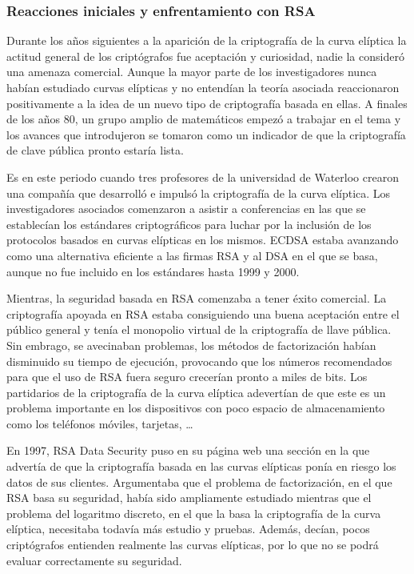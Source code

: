 \documentclass[
  a4paper,
  12pt,
  spanish,
]{scrartcl}
\begin{document}
\subsubsection{Reacciones iniciales y enfrentamiento con RSA}
Durante los años siguientes a la aparición de la criptografía de la curva elíptica la actitud general de los criptógrafos fue aceptación y curiosidad, nadie la consideró una amenaza comercial. Aunque la mayor parte de los investigadores nunca habían estudiado curvas elípticas y no entendían la teoría asociada reaccionaron positivamente a la idea de un nuevo tipo de criptografía basada en ellas. A finales de los años 80, un grupo amplio de matemáticos empezó a trabajar en el tema y los avances que introdujeron se tomaron como un indicador de que la criptografía de clave pública pronto estaría lista.

Es en este periodo cuando tres profesores de la universidad de Waterloo crearon una compañía que desarrolló e impulsó la criptografía de la curva elíptica. Los investigadores asociados comenzaron a asistir a conferencias en las que se establecían los estándares criptográficos para luchar por la inclusión de los protocolos basados en curvas elípticas en los mismos. ECDSA estaba avanzando como una alternativa eficiente a las firmas RSA y al DSA en el que se basa, aunque no fue incluido en los estándares hasta 1999 y 2000.

Mientras, la seguridad basada en RSA comenzaba a tener éxito comercial. La criptografía apoyada en RSA estaba consiguiendo una buena aceptación entre el público general y tenía el monopolio virtual de la criptografía de llave pública. Sin embrago, se avecinaban problemas, los métodos de factorización habían disminuido su tiempo de ejecución, provocando que los números recomendados para que el uso de RSA fuera seguro crecerían pronto a miles de bits. Los partidarios de la criptografía de la curva elíptica adevertían de que este es un problema importante en los dispositivos con poco espacio de almacenamiento como los teléfonos móviles, tarjetas, \dots

En 1997, RSA Data Security puso en su página web una sección en la que advertía de que la criptografía basada en las curvas elípticas ponía en riesgo los datos de sus clientes. Argumentaba que el problema de factorización, en el que RSA basa su seguridad, había sido ampliamente estudiado mientras que el problema del logaritmo discreto, en el que la basa la criptografía de la curva elíptica, necesitaba todavía más estudio y pruebas. Además, decían, pocos criptógrafos entienden realmente las curvas elípticas, por lo que no se podrá evaluar correctamente su seguridad.
\end{document}
